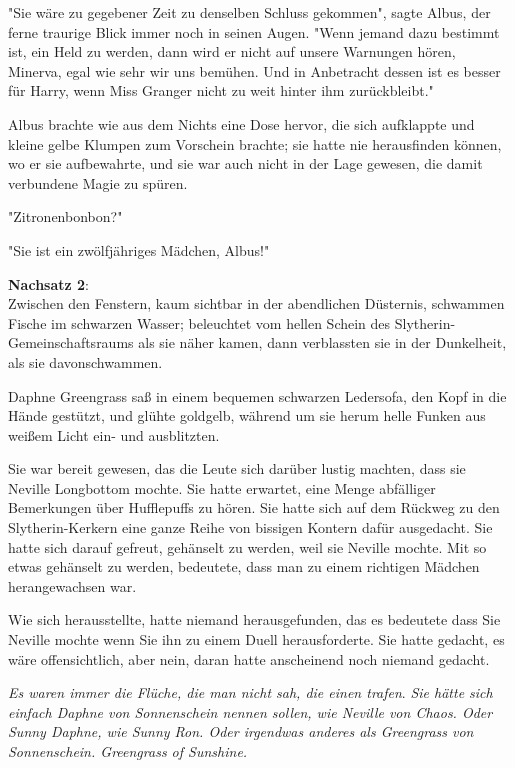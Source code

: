 {"Sie wäre zu gegebener Zeit zu denselben Schluss gekommen", sagte Albus, der ferne traurige Blick immer noch in seinen Augen. "Wenn jemand dazu bestimmt ist, ein Held zu werden, dann wird er nicht auf unsere Warnungen hören, Minerva, egal wie sehr wir uns bemühen. Und in Anbetracht dessen ist es besser für Harry, wenn Miss Granger nicht zu weit hinter ihm zurückbleibt."

Albus brachte wie aus dem Nichts eine Dose hervor, die sich aufklappte und kleine gelbe Klumpen zum Vorschein brachte; sie hatte nie herausfinden können, wo er sie aufbewahrte, und sie war auch nicht in der Lage gewesen, die damit verbundene Magie zu spüren.

"Zitronenbonbon?"

"Sie ist ein zwölfjähriges Mädchen, Albus!"

\textbf{Nachsatz 2}:\\ Zwischen den Fenstern, kaum sichtbar in der abendlichen Düsternis, schwammen Fische im schwarzen Wasser; beleuchtet vom hellen Schein des Slytherin-Gemeinschaftsraums als sie näher kamen, dann verblassten sie in der Dunkelheit, als sie davonschwammen.

Daphne Greengrass saß in einem bequemen schwarzen Ledersofa, den Kopf in die Hände gestützt, und glühte goldgelb, während um sie herum helle Funken aus weißem Licht ein- und ausblitzten.

Sie war bereit gewesen, das die Leute sich darüber lustig machten, dass sie Neville Longbottom mochte. Sie hatte erwartet, eine Menge abfälliger Bemerkungen über Hufflepuffs zu hören. Sie hatte sich auf dem Rückweg zu den Slytherin-Kerkern eine ganze Reihe von bissigen Kontern dafür ausgedacht. Sie hatte sich darauf gefreut, gehänselt zu werden, weil sie Neville mochte. Mit so etwas gehänselt zu werden, bedeutete, dass man zu einem richtigen Mädchen herangewachsen war.

Wie sich herausstellte, hatte niemand herausgefunden, das es bedeutete dass Sie Neville mochte wenn Sie ihn zu einem Duell herausforderte. Sie hatte gedacht, es wäre offensichtlich, aber nein, daran hatte anscheinend noch niemand gedacht.

\emph{Es waren immer die Flüche, die man nicht sah, die einen trafen}. \emph{Sie hätte sich einfach Daphne von Sonnenschein nennen sollen, wie Neville von Chaos. Oder Sunny Daphne, wie Sunny Ron. Oder irgendwas anderes als Greengrass von Sonnenschein. Greengrass of Sunshine.}

}
